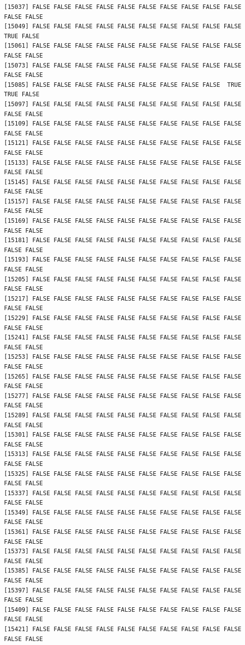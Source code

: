 \documentclass[
  a4paper,
  DIV=11,
  numbers=noendperiod]{scrartcl}
\begin{document}
\begin{verbatim}
[15037] FALSE FALSE FALSE FALSE FALSE FALSE FALSE FALSE FALSE FALSE FALSE FALSE
[15049] FALSE FALSE FALSE FALSE FALSE FALSE FALSE FALSE FALSE FALSE  TRUE FALSE
[15061] FALSE FALSE FALSE FALSE FALSE FALSE FALSE FALSE FALSE FALSE FALSE FALSE
[15073] FALSE FALSE FALSE FALSE FALSE FALSE FALSE FALSE FALSE FALSE FALSE FALSE
[15085] FALSE FALSE FALSE FALSE FALSE FALSE FALSE FALSE FALSE  TRUE  TRUE FALSE
[15097] FALSE FALSE FALSE FALSE FALSE FALSE FALSE FALSE FALSE FALSE FALSE FALSE
[15109] FALSE FALSE FALSE FALSE FALSE FALSE FALSE FALSE FALSE FALSE FALSE FALSE
[15121] FALSE FALSE FALSE FALSE FALSE FALSE FALSE FALSE FALSE FALSE FALSE FALSE
[15133] FALSE FALSE FALSE FALSE FALSE FALSE FALSE FALSE FALSE FALSE FALSE FALSE
[15145] FALSE FALSE FALSE FALSE FALSE FALSE FALSE FALSE FALSE FALSE FALSE FALSE
[15157] FALSE FALSE FALSE FALSE FALSE FALSE FALSE FALSE FALSE FALSE FALSE FALSE
[15169] FALSE FALSE FALSE FALSE FALSE FALSE FALSE FALSE FALSE FALSE FALSE FALSE
[15181] FALSE FALSE FALSE FALSE FALSE FALSE FALSE FALSE FALSE FALSE FALSE FALSE
[15193] FALSE FALSE FALSE FALSE FALSE FALSE FALSE FALSE FALSE FALSE FALSE FALSE
[15205] FALSE FALSE FALSE FALSE FALSE FALSE FALSE FALSE FALSE FALSE FALSE FALSE
[15217] FALSE FALSE FALSE FALSE FALSE FALSE FALSE FALSE FALSE FALSE FALSE FALSE
[15229] FALSE FALSE FALSE FALSE FALSE FALSE FALSE FALSE FALSE FALSE FALSE FALSE
[15241] FALSE FALSE FALSE FALSE FALSE FALSE FALSE FALSE FALSE FALSE FALSE FALSE
[15253] FALSE FALSE FALSE FALSE FALSE FALSE FALSE FALSE FALSE FALSE FALSE FALSE
[15265] FALSE FALSE FALSE FALSE FALSE FALSE FALSE FALSE FALSE FALSE FALSE FALSE
[15277] FALSE FALSE FALSE FALSE FALSE FALSE FALSE FALSE FALSE FALSE FALSE FALSE
[15289] FALSE FALSE FALSE FALSE FALSE FALSE FALSE FALSE FALSE FALSE FALSE FALSE
[15301] FALSE FALSE FALSE FALSE FALSE FALSE FALSE FALSE FALSE FALSE FALSE FALSE
[15313] FALSE FALSE FALSE FALSE FALSE FALSE FALSE FALSE FALSE FALSE FALSE FALSE
[15325] FALSE FALSE FALSE FALSE FALSE FALSE FALSE FALSE FALSE FALSE FALSE FALSE
[15337] FALSE FALSE FALSE FALSE FALSE FALSE FALSE FALSE FALSE FALSE FALSE FALSE
[15349] FALSE FALSE FALSE FALSE FALSE FALSE FALSE FALSE FALSE FALSE FALSE FALSE
[15361] FALSE FALSE FALSE FALSE FALSE FALSE FALSE FALSE FALSE FALSE FALSE FALSE
[15373] FALSE FALSE FALSE FALSE FALSE FALSE FALSE FALSE FALSE FALSE FALSE FALSE
[15385] FALSE FALSE FALSE FALSE FALSE FALSE FALSE FALSE FALSE FALSE FALSE FALSE
[15397] FALSE FALSE FALSE FALSE FALSE FALSE FALSE FALSE FALSE FALSE FALSE FALSE
[15409] FALSE FALSE FALSE FALSE FALSE FALSE FALSE FALSE FALSE FALSE FALSE FALSE
[15421] FALSE FALSE FALSE FALSE FALSE FALSE FALSE FALSE FALSE FALSE FALSE FALSE

\end{verbatim}
\end{document}
